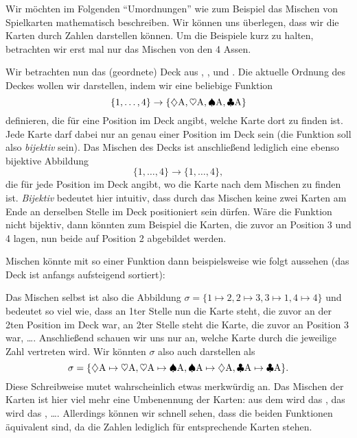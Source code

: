 \documentclass[../../main.tex]{subfiles}
\begin{document}
Wir möchten im Folgenden \enquote{Umordnungen} wie zum Beispiel das Mischen von Spielkarten mathematisch beschreiben. Wir können uns überlegen, dass wir die Karten durch Zahlen darstellen können. Um die Beispiele kurz zu halten, betrachten wir erst mal nur das Mischen von den 4 Assen.
\begin{example}{}
    Wir betrachten nun das (geordnete) Deck aus \AceDiamond{}, \AceHeart{}, \AceSpade{} und \AceClub. Die aktuelle Ordnung des Deckes wollen wir darstellen, indem wir eine beliebige Funktion $$\{1,\dots, 4\} \to \{\diamondsuit\text{A},\heartsuit\text{A},\spadesuit\text{A},\clubsuit\text{A}\}$$ definieren, die für eine Position im Deck angibt, welche Karte dort zu finden ist. Jede Karte darf dabei nur an genau einer Position im Deck sein (die Funktion soll also \emph{bijektiv} sein). Das Mischen des Decks ist anschließend lediglich eine ebenso bijektive Abbildung $$\{1,\dots, 4\} \to \{1,\dots,4\},$$ die für jede Position im Deck angibt, wo die Karte nach dem Mischen zu finden ist. \emph{Bijektiv} bedeutet hier intuitiv, dass durch das Mischen keine zwei Karten am Ende an derselben Stelle im Deck positioniert sein dürfen. Wäre die Funktion nicht bijektiv, dann könnten zum Beispiel die Karten, die zuvor an Position 3 und 4 lagen, nun beide auf Position 2 abgebildet werden. 
    
    Mischen könnte mit so einer Funktion dann beispielsweise wie folgt aussehen (das Deck ist anfangs aufsteigend sortiert):
    \begin{center}
    \end{center}
    Das Mischen selbst ist also die Abbildung $\sigma = \{1\mapsto 2, 2\mapsto 3, 3\mapsto 1, 4\mapsto 4\}$ und bedeutet so viel wie, dass an 1ter Stelle nun die Karte steht, die zuvor an der 2ten Position im Deck war, an 2ter Stelle steht die Karte, die zuvor an Position 3 war, \dots. Anschließend schauen wir uns nur an, welche Karte durch die jeweilige Zahl vertreten wird. Wir könnten $\sigma$ also auch darstellen als
    $$\sigma = \{\diamondsuit\text{A}\mapsto \heartsuit\text{A}, \heartsuit\text{A}\mapsto \spadesuit\text{A}, \spadesuit\text{A}\mapsto \diamondsuit\text{A}, \clubsuit\text{A}\mapsto \clubsuit\text{A}\}.$$
    Diese Schreibweise mutet wahrscheinlich etwas merkwürdig an. Das Mischen der Karten ist hier viel mehr eine Umbenennung der Karten: aus dem \AceDiamond{} wird das \AceHeart, das \AceHeart{} wird das \AceSpade, \dots. Allerdings können wir schnell sehen, dass die beiden Funktionen äquivalent sind, da die Zahlen lediglich für entsprechende Karten stehen.
\end{example}
\end{document}
